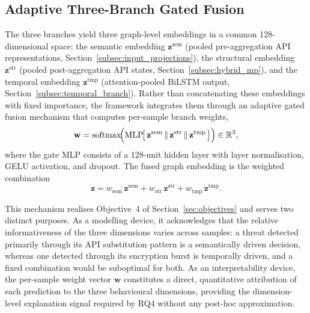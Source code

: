 \documentclass[%
    BCOR=10mm,
    DIV=13,
    toc=bibliography,
    toc=listof,
    oneside,
    12pt,
]{scrbook}
\begin{document}
\subsection{Adaptive Three-Branch Gated Fusion}
\label{subsec:fusion}

The three branches yield three graph-level embeddings in a common
128-di\-men\-sional space: the semantic embedding
$\mathbf{z}^{\mathrm{sem}}$ (pooled pre-aggregation API representations,
Section~\ref{subsec:input_projections}), the structural embedding
$\mathbf{z}^{\mathrm{str}}$ (pooled post-aggregation API states,
Section~\ref{subsec:hybrid_mp}), and the temporal embedding
$\mathbf{z}^{\mathrm{tmp}}$ (attention-pooled BiLSTM output,
Section~\ref{subsec:temporal_branch}). Rather than concatenating these
embeddings with fixed importance, the framework integrates them through an
adaptive gated fusion mechanism that computes per-sample branch weights,
\begin{equation}
  \mathbf{w} = \mathrm{softmax}\!\Bigl(
    \mathrm{MLP}\!\bigl[\,
      \mathbf{z}^{\mathrm{sem}} \,\|\,
      \mathbf{z}^{\mathrm{str}} \,\|\,
      \mathbf{z}^{\mathrm{tmp}}
    \,\bigr]\Bigr) \in \mathbb{R}^{3},
  \label{eq:branch_gate}
\end{equation}
where the gate MLP consists of a 128-unit hidden layer with layer
normalisation, GELU activation, and dropout. The fused graph embedding is the
weighted combination
\begin{equation}
  \mathbf{z} = w_{\mathrm{sem}}\,\mathbf{z}^{\mathrm{sem}}
             + w_{\mathrm{str}}\,\mathbf{z}^{\mathrm{str}}
             + w_{\mathrm{tmp}}\,\mathbf{z}^{\mathrm{tmp}}.
  \label{eq:branch_fusion}
\end{equation}

This mechanism realises Objective~4 of Section~\ref{sec:objectives} and serves
two distinct purposes. As a modelling device, it acknowledges that the
relative informativeness of the three dimensions varies across samples: a
threat detected primarily through its API substitution pattern is a
semantically driven decision, whereas one detected through its encryption
burst is temporally driven, and a fixed combination would be suboptimal for
both. As an interpretability device, the per-sample weight vector $\mathbf{w}$
constitutes a direct, quantitative attribution of each prediction to the three
behavioural dimensions, providing the dimension-level explanation signal
required by RQ4 without any post-hoc approximation.
\end{document}
